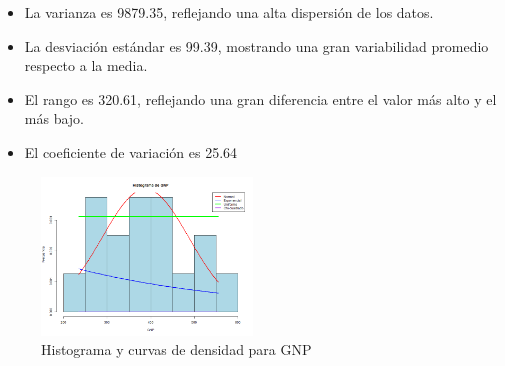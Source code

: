\documentclass{article}
\begin{document}
\begin{itemize}
\begin{itemize}
\begin{itemize}
                \item La varianza es 9879.35, reflejando una alta dispersión de los datos.
                \item La desviación estándar es 99.39, mostrando una gran variabilidad promedio respecto a la media.
                \item El rango es 320.61, reflejando una gran diferencia entre el valor más alto y el más bajo.
                \item El coeficiente de variación es 25.64%
            \end{itemize}
    \end{itemize}
    
    \begin{figure}[H]
        \centering
        \includegraphics[width=0.5\textwidth]{HistogramasDensidad/histograma_GNP.png}
        \caption{Histograma y curvas de densidad para GNP}
        \vspace{0.5cm}
    \end{figure}


\end{itemize}
\end{document}
